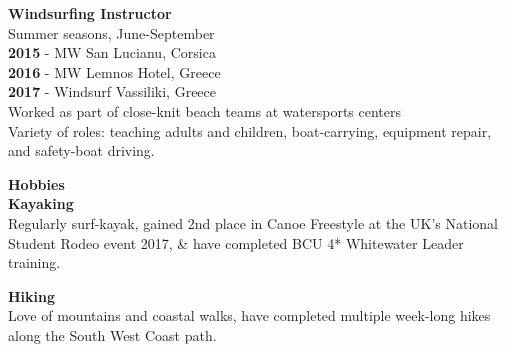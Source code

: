 \documentclass[10pt]{article}
\newcommand{\sect}[1]{{\LARGE{\textbf{#1}}}\vspace{0.1em}\\}
\newcommand{\xx}[2]{{\large\textbf{#1}}\\{#2}\vspace{0.5em}}
\begin{document}
\begin{minipage}[t]{0.33\textwidth}
\xx{Windsurfing Instructor}
{Summer seasons, June-September\\
\textbf{2015} - MW San Lucianu, Corsica\\
\textbf{2016} - MW Lemnos Hotel, Greece\\
\textbf{2017} - Windsurf Vassiliki, Greece\\
Worked as part of close-knit beach teams at watersports centers\\
Variety of roles: teaching adults and children, boat-carrying, equipment repair, and safety-boat driving.}


\hspace{0.1em}

\sect{Hobbies}

\xx{Kayaking}
{Regularly surf-kayak, gained 2nd place in Canoe Freestyle at the UK's National Student Rodeo event 2017, \& have completed BCU 4* Whitewater Leader training.
}

\xx{Hiking}
{Love of mountains and coastal walks, have completed multiple week-long hikes along the South West Coast path.}







\end{minipage} 
\hfill
\end{document}
